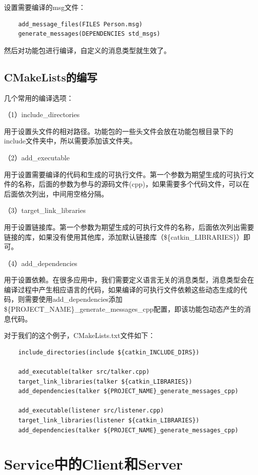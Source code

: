 \documentclass[10pt, oneside]{book}
\begin{document}
设置需要编译的msg文件：
\begin{verbatim}
    add_message_files(FILES Person.msg) 
    generate_messages(DEPENDENCIES std_msgs)
\end{verbatim}

然后对功能包进行编译，自定义的消息类型就生效了。

\subsection{CMakeLists的编写}

几个常用的编译选项：

（1）include\_directories

用于设置头文件的相对路径。功能包的一些头文件会放在功能包根目录下的include文件夹中，所以需要添加该文件夹。

（2）add\_executable

用于设置需要编译的代码和生成的可执行文件。第一个参数为期望生成的可执行文件的名称，后面的参数为参与的源码文件(cpp)，如果需要多个代码文件，可以在后面依次列出，中间用空格分隔。

（3）target\_link\_libraries

用于设置链接库。第一个参数为期望生成的可执行文件的名称，后面依次列出需要链接的库，如果没有使用其他库，添加默认链接库（\$\{catkin\_LIBRARIES\}）即可。

（4）add\_dependencies

用于设置依赖。在很多应用中，我们需要定义语言无关的消息类型，消息类型会在编译过程中产生相应语言的代码，如果编译的可执行文件依赖这些动态生成的代码，则需要使用add\_dependencies添加\$\{PROJECT\_NAME\}\_generate\_messages\_cpp配置，即该功能包动态产生的消息代码。

对于我们的这个例子，CMakeLists.txt文件如下：

\begin{verbatim}
    include_directories(include ${catkin_INCLUDE_DIRS})

    add_executable(talker src/talker.cpp)
    target_link_libraries(talker ${catkin_LIBRARIES})
    add_dependencies(talker ${PROJECT_NAME}_generate_messages_cpp)
      
    add_executable(listener src/listener.cpp)
    target_link_libraries(listener ${catkin_LIBRARIES})
    add_dependencies(talker ${PROJECT_NAME}_generate_messages_cpp)
\end{verbatim}


\section{Service中的Client和Server}
\end{document}
